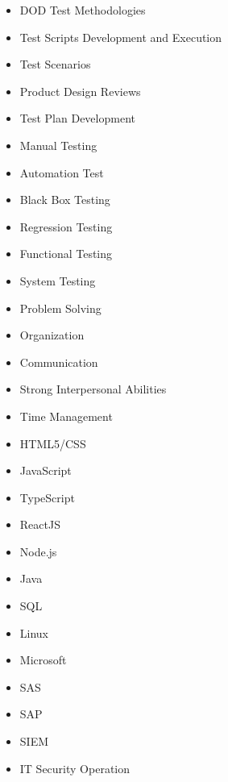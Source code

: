 \documentclass[a4paper,10pt]{article}
\begin{document}
\begin{multicols}{5}
\begin{itemize}
     \item DOD Test Methodologies
    \item Test Scripts Development and Execution
    \item Test Scenarios
    \item Product Design Reviews
    \item Test Plan Development
    \item Manual Testing
\end{itemize}
\begin{itemize}
     \item Automation Test
     \item Black Box Testing
    \item Regression Testing
    \item Functional Testing
    \item System Testing
    
\end{itemize}
\begin{itemize}
    \item Problem Solving
    \item Organization
    \item Communication
    \item Strong Interpersonal Abilities
    \item Time Management
\end{itemize}
\begin{itemize}
    \item HTML5/CSS
    \item JavaScript
    \item TypeScript
    \item ReactJS
    \item Node.js 
    \item Java
    \item SQL
\end{itemize}
\begin{itemize}
     \item Linux
    \item Microsoft 
    \item SAS
    \item SAP
    \item SIEM 
    \item IT Security Operation
\end{itemize}
\end{multicols}
\end{document}
